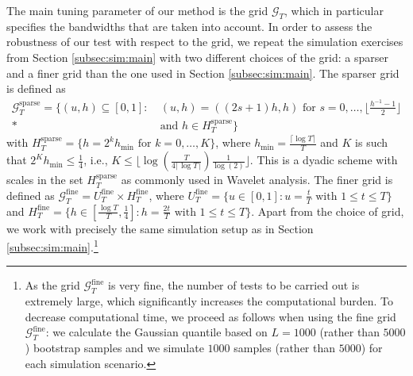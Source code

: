 \documentclass[12pt]{article}
\begin{document}
The main tuning parameter of our method is the grid $\mathcal{G}_T$, which in particular specifies the bandwidths that are taken into account. In order to assess the robustness of our test with respect to the grid, we repeat the simulation exercises from Section \ref{subsec:sim:main} with two different choices of the grid: a sparser and a finer grid than the one used in Section \ref{subsec:sim:main}.
The sparser grid is defined as
\begin{align}
\mathcal{G}_T^{\text{sparse}} = \big\{ (u,h) \subseteq [0,1]: & \ (u,h) = ((2s+1) h, h) \text{ for } s = 0,\ldots,\Big\lfloor \frac{h^ {-1}-1}{2} \Big\rfloor \nonumber \\* & \ \text{and } h \in H_T^{\text{sparse}} \big\} \label{eq:grid-sparse}
\end{align}
with $H_T^{\text{sparse}} = \{ h = 2^k h_{\min} \text{ for } k=0,\ldots,K \}$, where $h_{\min} = \frac{\lceil \log T \rceil}{T}$ and $K$ is such that $2^K h_{\min} \le \frac{1}{4}$, i.e., $K \le \lfloor \log(\frac{T}{4 \lceil \log T \rceil }) \frac{1}{\log(2)} \rfloor$. This is a dyadic scheme with scales in the set $H_T^{\text{sparse}}$ as commonly used in Wavelet analysis. 
The finer grid is defined as
$\mathcal{G}_T^{\text{fine}} = U_T^{\text{fine}} \times H_T^{\text{fine}}$,
where  
$U_T^{\text{fine}}  = \{ u \in [0,1]: u = \textstyle{\frac{t}{T}} \text{ with } 1 \le t \le T \}$
and
$H_T^{\text{fine}} = \{ h \in [ \textstyle{\frac{\log T}{T}}, \textstyle{\frac{1}{4}} ]:  h = \textstyle{\frac{2t}{T}} \text{ with } 1 \le t \le T \}$. Apart from the choice of grid, we work with precisely the same simulation setup as in Section \ref{subsec:sim:main}.\footnote{As the grid $\mathcal{G}_T^{\text{fine}}$ is very fine, the number of tests to be carried out is extremely large, which significantly increases the computational burden. To decrease computational time, we proceed as follows when using the fine grid $\mathcal{G}_T^{\text{fine}}$:  we calculate the Gaussian quantile based on $L = 1000$ (rather than $5000$) bootstrap samples and we simulate $1000$ samples (rather than $5000$) for each simulation scenario.}
\end{document}
